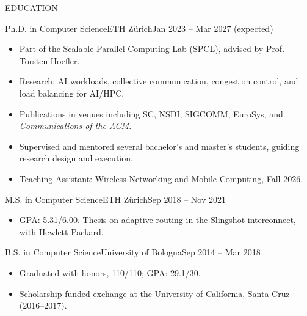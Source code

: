 \documentclass{mcdowellcv}
\begin{document}
\makeheader

\begin{cvsection}{EDUCATION}
    \begin{cvsubsection}{Ph.D. in Computer Science}{ETH Zürich}{Jan 2023 -- Mar 2027 (expected)}
        \begin{itemize}
            \item Part of the Scalable Parallel Computing Lab (SPCL), advised by Prof. Torsten Hoefler.
            \item Research: AI workloads, collective communication, congestion control, and load balancing for AI/HPC.
            \item Publications in venues including SC, NSDI, SIGCOMM, EuroSys, and \textit{Communications of the ACM}.
            \item Supervised and mentored several bachelor's and master's students, guiding research design and execution.
            \item Teaching Assistant: Wireless Networking and Mobile Computing, Fall 2026.
        \end{itemize}
    \end{cvsubsection}

    \begin{cvsubsection}{M.S. in Computer Science}{ETH Zürich}{Sep 2018 -- Nov 2021}
        \begin{itemize}
            \item GPA: 5.31/6.00. Thesis on adaptive routing in the Slingshot interconnect, with Hewlett-Packard.
        \end{itemize}
    \end{cvsubsection}

    \begin{cvsubsection}{B.S. in Computer Science}{University of Bologna}{Sep 2014 -- Mar 2018}
        \begin{itemize}
            \item Graduated with honors, 110/110; GPA: 29.1/30.
            \item Scholarship-funded exchange at the University of California, Santa Cruz (2016--2017).
        \end{itemize}
    \end{cvsubsection}
\end{cvsection}
\end{document}
